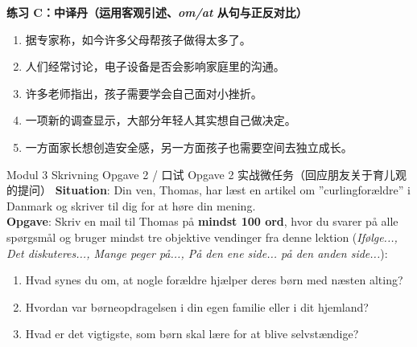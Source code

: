 \textbf{练习 C：中译丹（运用客观引述、\textit{om/at} 从句与正反对比）}
\begin{enumerate}
  \item 据专家称，如今许多父母帮孩子做得太多了。
  \item 人们经常讨论，电子设备是否会影响家庭里的沟通。
  \item 许多老师指出，孩子需要学会自己面对小挫折。
  \item 一项新的调查显示，大部分年轻人其实想自己做决定。
  \item 一方面家长想创造安全感，另一方面孩子也需要空间去独立成长。
\end{enumerate}


\begin{emailbox}{Modul 3 Skrivning Opgave 2 / 口试 Opgave 2 实战微任务（回应朋友关于育儿观的提问）}
\textbf{Situation}: Din ven, Thomas, har læst en artikel om ”curlingforældre” i Danmark og skriver til dig for at høre din mening.\\
\textbf{Opgave}: Skriv en mail til Thomas på \textbf{mindst 100 ord}, hvor du svarer på alle spørgsmål og bruger mindst tre objektive vendinger fra denne lektion (\textit{Ifølge..., Det diskuteres..., Mange peger på..., På den ene side... på den anden side...}):
\begin{enumerate}
  \item Hvad synes du om, at nogle forældre hjælper deres børn med næsten alting?
  \item Hvordan var børneopdragelsen i din egen familie eller i dit hjemland?
  \item Hvad er det vigtigste, som børn skal lære for at blive selvstændige?
\end{enumerate}
\end{emailbox}

